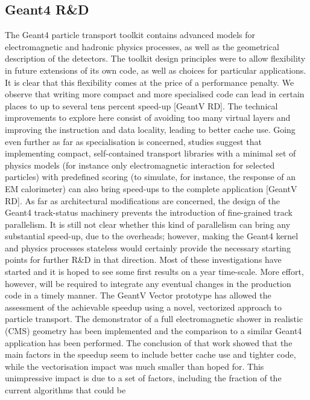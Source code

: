 \documentclass[11pt,a4paper]{article}
\begin{document}
\hypertarget{geant4-rd}{%
\subsection{Geant4 R\&D}\label{geant4-rd}}

The Geant4 particle transport toolkit contains advanced models for
electromagnetic and hadronic physics processes, as well as the
geometrical description of the detectors. The toolkit design principles
were to allow flexibility in future extensions of its own code, as well
as choices for particular applications. It is clear that this
flexibility comes at the price of a performance penalty. We observe that
writing more compact and more specialised code can lead in certain
places to up to several tens percent speed-up {[}GeantV RD{]}. The
technical improvements to explore here consist of avoiding too many
virtual layers and improving the instruction and data locality, leading
to better cache use. Going even further as far as specialisation is
concerned, studies suggest that implementing compact, self-contained
transport libraries with a minimal set of physics models (for instance
only electromagnetic interaction for selected particles) with predefined
scoring (to simulate, for instance, the response of an EM calorimeter)
can also bring speed-ups to the complete application {[}GeantV RD{]}. As
far as architectural modifications are concerned, the design of the
Geant4 track-status machinery prevents the introduction of fine-grained
track parallelism. It is still not clear whether this kind of
parallelism can bring any substantial speed-up, due to the overheads;
however, making the Geant4 kernel and physics processes stateless would
certainly provide the necessary starting points for further R\&D in that
direction. Most of these investigations have started and it is hoped to
see some first results on a year time-scale. More effort, however, will
be required to integrate any eventual changes in the production code in
a timely manner. The GeantV Vector prototype has allowed the assessment
of the achievable speedup using a novel, vectorized approach to particle
transport. The demonstrator of a full electromagnetic shower in
realistic (CMS) geometry has been implemented and the comparison to a
similar Geant4 application has been performed. The conclusion of that
work showed that the main factors in the speedup seem to include better
cache use and tighter code, while the vectorisation impact was much
smaller than hoped for. This unimpressive impact is due to a set of
factors, including the fraction of the current algorithms that could be
\end{document}
